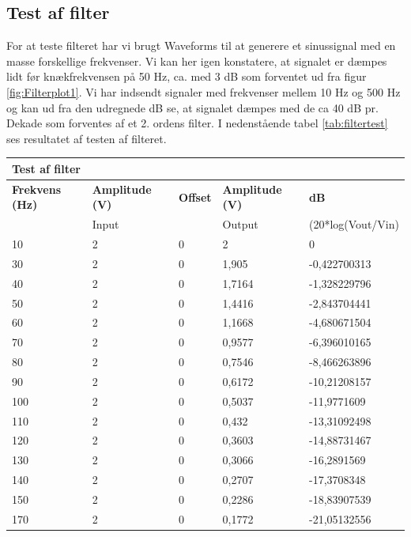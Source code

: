\subsection{Test af filter}
\vspace{0.2 cm}
For at teste filteret har vi brugt Waveforms til at generere et sinussignal med en masse forskellige frekvenser. Vi kan her igen konstatere, at signalet er dæmpes lidt før knækfrekvensen på 50 Hz, ca. med 3 dB som forventet ud fra figur \vref{fig:Filterplot1}. Vi har indsendt signaler med frekvenser mellem 10 Hz og 500 Hz og kan ud fra den udregnede dB se, at signalet dæmpes med de ca 40 dB pr. Dekade som forventes af et 2. ordens filter. I nedenstående tabel \vref{tab:filtertest} ses resultatet af testen af filteret.
\vspace{0.2 cm}
\begin{table}[h!]
	\centering
	\begin{tabular}{l|l|l|l|l}
		\multicolumn{5}{l}{\textbf{Test af filter}} \\
		\hline
		\textbf{Frekvens (Hz)} & \textbf{Amplitude (V)} & \textbf{Offset} & \textbf{Amplitude (V)} & \textbf{dB} \\
		& Input &  & Output & (20*log(Vout/Vin) \\
		\hline
		10 & 2 & 0 & 2 & 0 \\
		\hline
		30 & 2 & 0 & 1,905 & -0,422700313 \\
		\hline
		40 & 2 & 0 & 1,7164 & -1,328229796 \\
		\hline
		50 & 2 & 0 & 1,4416 & -2,843704441 \\
		\hline
		60 & 2 & 0 & 1,1668 & -4,680671504 \\
		\hline
		70 & 2 & 0 & 0,9577 & -6,396010165 \\
		\hline
		80 & 2 & 0 & 0,7546 & -8,466263896 \\
		\hline
		90 & 2 & 0 & 0,6172 & -10,21208157 \\
		\hline
		100 & 2 & 0 & 0,5037 & -11,9771609 \\
		\hline
		110 & 2 & 0 & 0,432 & -13,31092498 \\
		\hline
		120 & 2 & 0 & 0,3603 & -14,88731467 \\
		\hline
		130 & 2 & 0 & 0,3066 & -16,2891569 \\
		\hline
		140 & 2 & 0 & 0,2707 & -17,3708348 \\
		\hline
		150 & 2 & 0 & 0,2286 & -18,83907539 \\
		\hline
		170 & 2 & 0 & 0,1772 & -21,05132556 \\

\end{tabular}
\end{table}
